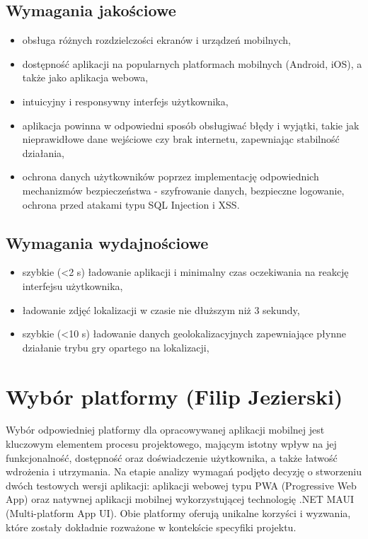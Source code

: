 \subsection{Wymagania jakościowe}
\begin{itemize}
    \item obsługa różnych rozdzielczości ekranów i urządzeń mobilnych,
    \item dostępność aplikacji na popularnych platformach mobilnych (Android, iOS), a także jako aplikacja webowa,
    \item intuicyjny i responsywny interfejs użytkownika,
    \item aplikacja powinna w odpowiedni sposób obsługiwać błędy i wyjątki, takie jak nieprawidłowe dane wejściowe czy brak internetu, zapewniając stabilność działania,
    \item ochrona danych użytkowników poprzez implementację odpowiednich mechanizmów bezpieczeństwa - szyfrowanie danych, bezpieczne logowanie, ochrona przed atakami typu SQL Injection i XSS.
\end{itemize}

\subsection{Wymagania wydajnościowe}
\begin{itemize}
    \item szybkie (<2 s) ładowanie aplikacji i minimalny czas oczekiwania na reakcję interfejsu użytkownika,
    \item ładowanie zdjęć lokalizacji w czasie nie dłuższym niż 3 sekundy,
    \item szybkie (<10 s) ładowanie danych geolokalizacyjnych zapewniające płynne działanie trybu gry opartego na lokalizacji,
\end{itemize}

\section{Wybór platformy (Filip Jezierski)}
Wybór odpowiedniej platformy dla opracowywanej aplikacji mobilnej jest kluczowym elementem procesu projektowego, mającym istotny wpływ na jej funkcjonalność, dostępność oraz doświadczenie użytkownika, a także łatwość wdrożenia i utrzymania. Na etapie analizy wymagań podjęto decyzję o stworzeniu dwóch testowych wersji aplikacji: aplikacji webowej typu PWA (Progressive Web App) oraz natywnej aplikacji mobilnej wykorzystującej technologię .NET MAUI (Multi-platform App UI). Obie platformy oferują unikalne korzyści i wyzwania, które zostały dokładnie rozważone w kontekście specyfiki projektu.

